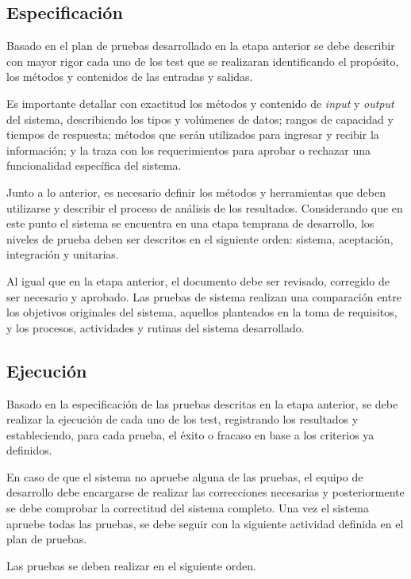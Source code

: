 \subsection{Especificación}

Basado en el plan de pruebas desarrollado en la etapa anterior se debe describir con mayor rigor cada uno de los test que se realizaran identificando el propósito, los métodos y contenidos de las entradas y salidas.

Es importante detallar con exactitud los métodos y contenido de \textit{input} y \textit{output} del sistema, describiendo los tipos y volúmenes de datos; rangos de capacidad y tiempos de respuesta; métodos que serán utilizados para ingresar y recibir la información; y la traza con los requerimientos para aprobar o rechazar una funcionalidad específica del sistema.

Junto a lo anterior, es necesario definir los métodos y herramientas que deben utilizarse y describir el proceso de análisis de los resultados.
Considerando que en este punto el sistema se encuentra en una etapa temprana de desarrollo, los niveles de prueba deben ser descritos en el siguiente orden: sistema, aceptación, integración y unitarias.

Al igual que en la etapa anterior, el documento debe ser revisado, corregido de ser necesario y aprobado. 
Las pruebas de sistema realizan una comparación entre los objetivos originales del sistema, aquellos planteados en la toma de requisitos, y los procesos, actividades y rutinas del sistema desarrollado.

\subsection{Ejecución}

Basado en la especificación de las pruebas descritas en la etapa anterior, se debe realizar la ejecución de cada uno de los test, registrando los resultados y estableciendo, para cada prueba, el éxito o fracaso en base a los criterios ya definidos. 

En caso de que el sistema no apruebe alguna de las pruebas, el equipo de desarrollo debe encargarse de realizar las correcciones necesarias y posteriormente se debe comprobar la correctitud del sistema completo. 
Una vez el sistema apruebe todas las pruebas, se debe seguir con la siguiente actividad definida en el plan de pruebas. 

Las pruebas se deben realizar en el siguiente orden.

